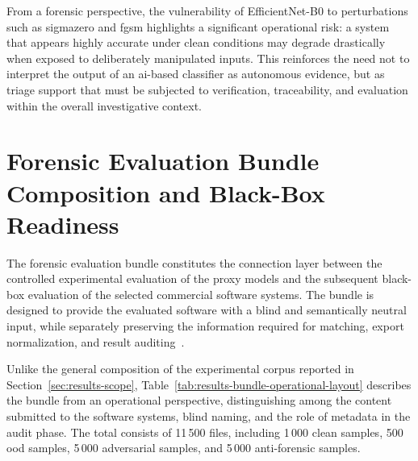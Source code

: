 From a forensic perspective, the vulnerability of EfficientNet-B0 to
perturbations such as \gls{sigmazero} and \gls{fgsm} highlights a significant
operational risk: a system that appears highly accurate under clean conditions
may degrade drastically when exposed to deliberately manipulated inputs. This
reinforces the need not to interpret the output of an \gls{ai}-based classifier
as autonomous evidence, but as triage support that must be subjected to
verification, traceability, and evaluation within the overall investigative
context.


\section{Forensic Evaluation Bundle Composition and Black-Box Readiness}
\label{sec:results-bundle}

The forensic evaluation bundle constitutes the connection layer between the
controlled experimental evaluation of the proxy models and the subsequent
black-box evaluation of the selected commercial software systems. The bundle is
designed to provide the evaluated software with a blind and semantically
neutral input, while separately preserving the information required for
matching, export normalization, and result
auditing~\cite{casey2011digital,nist2006guide,iso27041,iso27042,swgde2014validation}.

Unlike the general composition of the experimental corpus reported in
Section~\ref{sec:results-scope},
Table~\ref{tab:results-bundle-operational-layout} describes the bundle from an
operational perspective, distinguishing among the content submitted to the
software systems, blind naming, and the role of metadata in the audit phase.
The total consists of 11\,500 files, including 1\,000 clean samples,
500 \gls{ood} samples, 5\,000 adversarial samples, and 5\,000 anti-forensic
samples.

